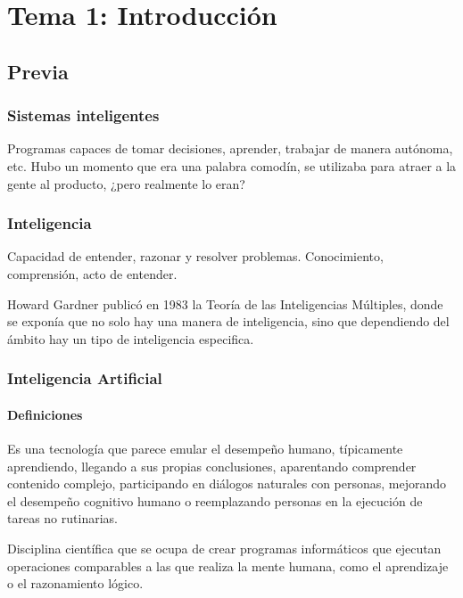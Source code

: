 \documentclass[12pt, twoside, openright]{report} %
\begin{document}
\chapter{Tema 1: Introducción}
\section{Previa}
\subsection{Sistemas inteligentes}
Programas capaces de tomar decisiones, aprender, trabajar de manera autónoma, etc. Hubo un momento que era una palabra comodín, se utilizaba para atraer a la gente al producto, ¿pero realmente lo eran?

\subsection{Inteligencia}
Capacidad de entender, razonar y resolver problemas. Conocimiento, comprensión, acto de entender.

Howard Gardner publicó en 1983 la Teoría de las Inteligencias Múltiples, donde se exponía que no solo hay una manera de inteligencia, sino que dependiendo del ámbito hay un tipo de inteligencia especifica.
\begin{figure}[H]
	{\def\svgwidth{.8\textwidth}
		}
\end{figure}

\subsection{Inteligencia Artificial}
\subsubsection{Definiciones}
Es una tecnología que parece emular el desempeño humano, típicamente aprendiendo, llegando a sus propias conclusiones, aparentando comprender contenido complejo, participando en diálogos naturales con personas, mejorando el desempeño cognitivo humano o reemplazando personas en la ejecución de tareas no rutinarias.

Disciplina científica que se ocupa de crear programas informáticos que ejecutan operaciones comparables a las que realiza la mente humana, como el aprendizaje o el razonamiento lógico.
\end{document}
